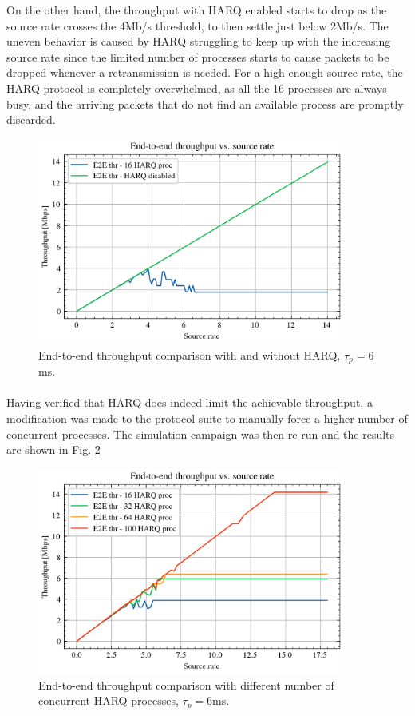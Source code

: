 On the other hand, the throughput with \ac{HARQ} enabled starts to drop as the source rate crosses the 4Mb/s threshold, to then settle just below 2Mb/s. The uneven behavior is caused by \ac{HARQ} struggling to keep up with the increasing source rate since the limited number of processes starts to cause packets to be dropped whenever a retransmission is needed. For a high enough source rate, the \ac{HARQ} protocol is completely overwhelmed, as all the 16 processes are always busy, and the arriving packets that do not find an available process are promptly discarded.


\begin{figure}[ht]
    \centering
    \includegraphics[width=0.9\textwidth]{res/harq_onoff.png}
    \caption{End-to-end throughput comparison with and without \ac{HARQ}, $\tau_p=6$ms.}
    \label{fig:harq_on_off}
\end{figure}

\paragraph{}
Having verified that \ac{HARQ} does indeed limit the achievable throughput, a modification was made to the protocol suite to manually force a higher number of concurrent processes. The simulation campaign was then re-run and the results are shown in Fig. \ref{fig:harq-numproc}

\begin{figure}[ht]
    \centering
    \includegraphics[width=0.9\textwidth]{res/harq_numproc_new.png}
    \caption{End-to-end throughput comparison with different number of concurrent \ac{HARQ} processes, $\tau_p=6$ms.}
    \label{fig:harq-numproc}
\end{figure}

